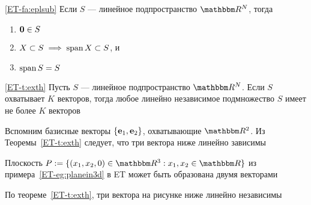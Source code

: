 \begin{frame}

    \vspace{.7em}
    \Fact\eqref{ET-fa:eplsub}
    Если $S$ --- линейное подпространство $\RR^N$, тогда
    \begin{enumerate}
        \item ${\mathbf 0} \in S$
        \item $X \subset S \implies \operatorname{span} X \subset S$, и
        \item $\operatorname{span} S = S$
    \end{enumerate}
    \vspace{2em}
    
    \Thm\eqref{ET-t:exth}
    Пусть $S$ --- линейное подпространство $\RR^N$. Если $S$ охватывает $K$ векторов,
    тогда любое линейно независимое подмножество $S$ имеет не более $K$
    векторов
    
\end{frame}

\begin{frame}

    \vspace{2em}
    \Eg
    Вспомним базисные векторы
    $\{{\mathbf e}_1, {\mathbf e}_2\}$, охватывающие $\RR^2$. Из Теоремы~\ref{ET-t:exth} 
    следует, что три вектора ниже линейно зависимы
    \begin{figure}
       \begin{center}
       \end{center}
    \end{figure}
    
\end{frame}

\begin{frame}

    \vspace{2em}
    \Eg
    Плоскость
        $P := \setntn{(x_1, x_2, 0) \in \RR^3}{ x_1, x_2 \in \RR}$
    из примера~\ref{ET-eg:planein3d} в ET может быть образована двумя векторами
    
    По теореме~\ref{ET-t:exth}, три вектора на рисунке ниже линейно независимы 
    \begin{figure}
       \begin{center}
       \end{center}
    \end{figure}

\end{frame}

